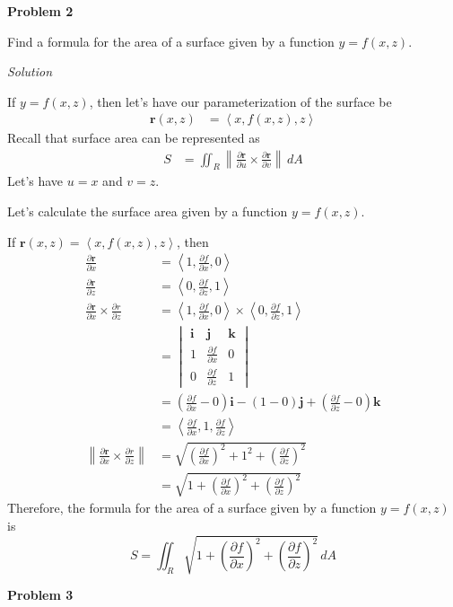 \documentclass{article}
\newcommand{\lrp}[1]{\left( #1 \right)}
\newcommand{\lra}[1]{\left\langle #1 \right\rangle}
\newcommand{\norm}[1]{\left\lVert #1 \right\rVert}
\renewcommand{\i}[0]{\mathbf{i}}
\renewcommand{\j}[0]{\mathbf{j}}
\renewcommand{\k}[0]{\mathbf{k}}
\renewcommand{\r}[0]{\mathbf{r}}
\newcommand{\Solution}{\textit{Solution}}
\begin{document}
{}\textbf{Problem 2} 

Find a formula for the area of a surface given by a function $y=f(x,z)$.

\Solution

If $y=f(x,z)$, then let's have our parameterization of the surface be
\begin{align*}
    \r(x,z)&=\lra{x,f(x,z),z}
\end{align*}
Recall that surface area can be represented as
\begin{align*}
    S&=\iint_R \norm{\frac{\partial \r}{\partial u}\times \frac{\partial \r}{\partial v}}\,dA
\end{align*}
Let's have $u=x$ and $v=z$.

Let's calculate the surface area given by a function $y=f(x,z)$.

If $\displaystyle   \r(x,z)=\lra{x,f(x,z),z}$, then
\begin{align*}
    \frac{\partial \r}{\partial x}&=\lra{1, \frac{\partial f}{\partial x}, 0}\\
    \frac{\partial \r}{\partial z}&=\lra{0, \frac{\partial f}{\partial z}, 1}\\
    \frac{\partial \r}{\partial x}\times \frac{\partial r}{\partial z} &= \lra{1, \frac{\partial f}{\partial x}, 0}\times \lra{0, \frac{\partial f}{\partial z}, 1}\\
    &=\begin{vmatrix}\i & \j & \k\\
    1 & \frac{\partial f}{\partial x} & 0\\
    0 & \frac{\partial f}{\partial z} & 1\end{vmatrix}\\
    &=\lrp{\frac{\partial f}{\partial x}-0}\i-\lrp{1-0}\j+\lrp{\frac{\partial f}{\partial z}-0}\k\\
    &=\lra{\frac{\partial f}{\partial x},1,\frac{\partial f}{\partial z}}\\
    \norm{\frac{\partial \r}{\partial x}\times \frac{\partial r}{\partial z}}&=\sqrt{\lrp{\frac{\partial f}{\partial x}}^2+1^2+\lrp{\frac{\partial f}{\partial z}}^2}\\
    &=\sqrt{1+\lrp{\frac{\partial f}{\partial x}}^2+\lrp{\frac{\partial f}{\partial z}}^2}
\end{align*}
Therefore, the formula for the area of a surface  given by a function $y=f(x,z)$ is
\begin{equation*}
   \boxed{ S=\iint_R \sqrt{1+\lrp{\frac{\partial f}{\partial x}}^2+\lrp{\frac{\partial f}{\partial z}}^2}\,dA}
\end{equation*}
\newpage
{}
{}\textbf{Problem 3} 
\end{document}
